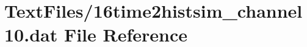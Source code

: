 \hypertarget{16time2histsim__channel10_8dat}{}\section{Text\+Files/16time2histsim\+\_\+channel10.dat File Reference}
\label{16time2histsim__channel10_8dat}
